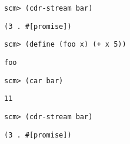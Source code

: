 \begin{lstlisting}
scm> (cdr-stream bar)
\end{lstlisting}
\begin{solution}[.25in]
\begin{lstlisting}
(3 . #[promise])
\end{lstlisting}
\end{solution}

\begin{lstlisting}
scm> (define (foo x) (+ x 5))
\end{lstlisting}
\begin{solution}[.25in]
\texttt{foo}
\end{solution}

\begin{lstlisting}
scm> (car bar)
\end{lstlisting}
\begin{solution}[.25in]
\texttt{11}
\end{solution}

\begin{lstlisting}
scm> (cdr-stream bar)
\end{lstlisting}
\begin{solution}[.25in]
\begin{lstlisting}
(3 . #[promise])
\end{lstlisting}
\end{solution}
